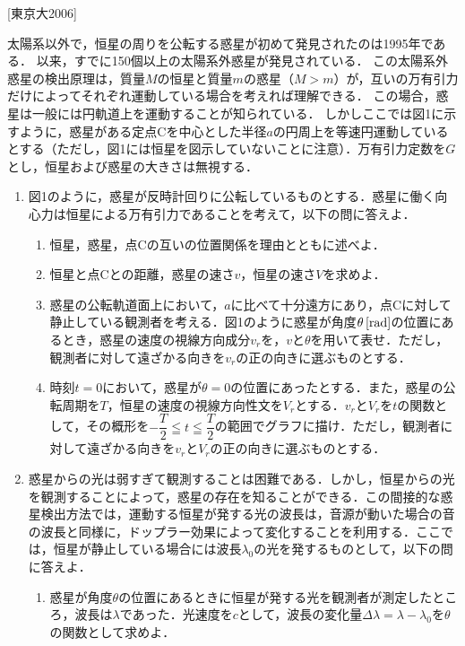

\noindent
{} [東京大2006]

太陽系以外で，恒星の周りを公転する惑星が初めて発見されたのは1995年である．
以来，すでに150個以上の太陽系外惑星が発見されている．
この太陽系外惑星の検出原理は，質量$M$の恒星と質量$m$の惑星（$M > m$）が，互いの万有引力だけによってそれぞれ運動している場合を考えれば理解できる．
この場合，惑星は一般には円軌道上を運動することが知られている．
しかしここでは図1に示すように，惑星がある定点Cを中心とした半径$a$の円周上を等速円運動しているとする（ただし，図1には恒星を図示していないことに注意）．万有引力定数を$G$とし，恒星および惑星の大きさは無視する．

\begin{enumerate}[I]
  \item {\hzw}図1のように，惑星が反時計回りに公転しているものとする．惑星に働く向心力は恒星による万有引力であることを考えて，以下の問に答えよ．
  \begin{enumerate}[(1)]
    \item {\hzw}恒星，惑星，点Cの互いの位置関係を理由とともに述べよ．
    \item {\hzw}恒星と点Cとの距離，惑星の速さ$v$，恒星の速さ$V$を求めよ．
    \item {\hzw}惑星の公転軌道面上において，$a$に比べて十分遠方にあり，点Cに対して静止している観測者を考える．図1のように惑星が角度$\theta \, [\mathrm{rad}]$の位置にあるとき，惑星の速度の視線方向成分$v_r$を，$v$と$\theta$を用いて表せ．ただし，観測者に対して遠ざかる向きを$v_r$の正の向きに選ぶものとする．
    \item {\hzw}時刻$t = 0$において，惑星が$\theta = 0$の位置にあったとする．また，惑星の公転周期を$T$，恒星の速度の視線方向性文を$V_r$とする．$v_r$と$V_r$を$t$の関数として，その概形を$-\dfrac{T}{2} \leqq t \leqq \dfrac{T}{2}$の範囲でグラフに描け．ただし，観測者に対して遠ざかる向きを$v_r$と$V_r$の正の向きに選ぶものとする．
    \end{enumerate}
    \item {\hzw}惑星からの光は弱すぎて観測することは困難である．しかし，恒星からの光を観測することによって，惑星の存在を知ることができる．この間接的な惑星検出方法では，運動する恒星が発する光の波長は，音源が動いた場合の音の波長と同様に，ドップラー効果によって変化することを利用する．ここでは，恒星が静止している場合には波長$\lambda_0$の光を発するものとして，以下の問に答えよ．
    \begin{enumerate}[(1)]
      \item {\hzw}惑星が角度$\theta$の位置にあるときに恒星が発する光を観測者が測定したところ，波長は$\lambda$であった．光速度を$c$として，波長の変化量$\varDelta \lambda = \lambda - \lambda_0$を$\theta$の関数として求めよ．

\end{enumerate}
\end{enumerate}
